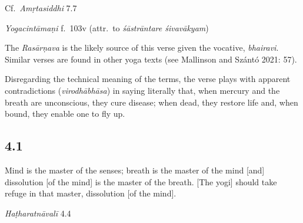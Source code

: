 \begin{ekdosis}
\begin{sources}[hp04_000_16]
Cf.~\emph{Amṛtasiddhi} 7.7
\begin{versinnote}
\end{versinnote}
\end{sources}

\begin{testimonia}[hp04_000_16]
\emph{Yogacintāmaṇi} f.~103v (attr.~to \emph{śāstrāntare śivavākyam})
\begin{versinnote}
\end{versinnote}
\end{testimonia}

\begin{philcomm}[hp04_000_16]
The \emph{Rasārṇava} is the likely source of this verse given the vocative, \emph{bhairavi}. Similar verses are found in other yoga texts (see Mallinson and Szántó 2021: 57).

Disregarding the technical meaning of the terms, the verse plays with apparent contradictions (\emph{virodhābhāsa}) in saying literally that, when mercury and the breath are unconscious, they cure disease; when dead, they restore life and, when bound, they enable one to fly up.
\end{philcomm}

\subsection*{4.1}
\begin{translation}[hp04_001]
Mind is the master of the senses; breath is the master of the mind [and] dissolution [of the mind] is the master of the breath. [The yogi] should take refuge in that master, dissolution [of the mind].
\end{translation}
%


\begin{testimonia}[hp04_001]
\emph{Haṭharatnāvalī} 4.4
\begin{versinnote}
\end{versinnote}


\end{testimonia}
\end{ekdosis}
